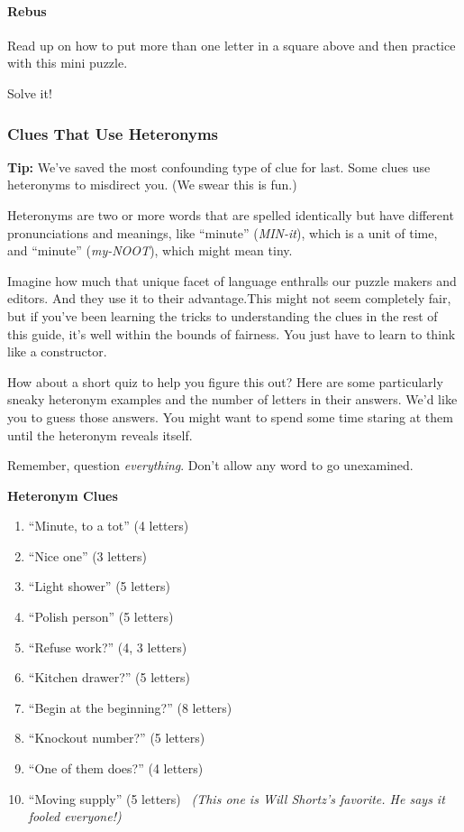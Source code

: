 \href{https://www.nytimes.com/crosswords/game/special/rebus}{}

\hypertarget{rebus}{%
\paragraph{Rebus}\label{rebus}}

Read up on how to put more than one letter in a square above and then
practice with this mini puzzle.

Solve it!

\hypertarget{clues-that-use-heteronyms}{%
\subsubsection{Clues That Use
Heteronyms}\label{clues-that-use-heteronyms}}

\textbf{Tip:} We've saved the most confounding type of clue for last.
Some clues use heteronyms to misdirect you. (We swear this is fun.)~

Heteronyms are two or more words that are spelled identically but have
different pronunciations and meanings, like ``minute'' (\emph{MIN-it}),
which is a unit of time, and ``minute'' (\emph{my-NOOT}), which might
mean tiny.~

Imagine how much that unique facet of language enthralls our puzzle
makers and editors. And they use it to their advantage.This might not
seem completely fair, but if you've been learning the tricks to
understanding the clues in the rest of this guide, it's well within the
bounds of fairness. You just have to learn to think like a constructor.

How about a short quiz to help you figure this out? Here are some
particularly sneaky heteronym examples and the number of letters in
their answers. We'd like you to guess those answers. You might want to
spend some time staring at them until the heteronym reveals itself.~

Remember, question \emph{everything}. Don't allow any word to go
unexamined.

\textbf{Heteronym Clues}~

\begin{enumerate}
\def\labelenumi{\arabic{enumi}.}
\tightlist
\item
  ``Minute, to a tot'' (4 letters)
\item
  ``Nice one'' (3 letters)
\item
  ``Light shower'' (5 letters)
\item
  ``Polish person'' (5 letters)
\item
  ``Refuse work?'' (4, 3 letters)
\item
  ``Kitchen drawer?'' (5 letters)
\item
  ``Begin at the beginning?'' (8 letters)
\item
  ``Knockout number?'' (5 letters)
\item
  ``One of them does?'' (4 letters)
\item
  ``Moving supply'' (5 letters) ~\emph{(This one is Will Shortz's
  favorite. He says it fooled everyone!)}
\end{enumerate}

